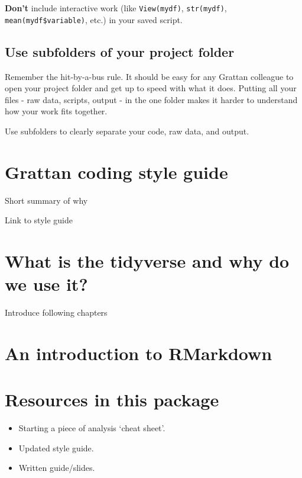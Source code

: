 \documentclass[]{book}
\providecommand{\tightlist}{%
  \setlength{\itemsep}{0pt}\setlength{\parskip}{0pt}}
\begin{document}
\textbf{Don't} include interactive work (like \texttt{View(mydf)}, \texttt{str(mydf)}, \texttt{mean(mydf\$variable)}, etc.) in your saved script.

\hypertarget{use-subfolders-of-your-project-folder}{%
\subsection{Use subfolders of your project folder}\label{use-subfolders-of-your-project-folder}}

Remember the hit-by-a-bus rule. It should be easy for any Grattan colleague to open your project folder and get up to speed with what it does. Putting all your files - raw data, scripts, output - in the one folder makes it harder to understand how your work fits together.

Use subfolders to clearly separate your code, raw data, and output.

\hypertarget{grattan-coding-style-guide}{%
\section{Grattan coding style guide}\label{grattan-coding-style-guide}}

Short summary of why

Link to style guide

\hypertarget{what-is-the-tidyverse-and-why-do-we-use-it}{%
\section{What is the tidyverse and why do we use it?}\label{what-is-the-tidyverse-and-why-do-we-use-it}}

Introduce following chapters

\hypertarget{an-introduction-to-rmarkdown}{%
\section{An introduction to RMarkdown}\label{an-introduction-to-rmarkdown}}

\hypertarget{resources-in-this-package}{%
\section{Resources in this package}\label{resources-in-this-package}}

\begin{itemize}
\tightlist
\item
  Starting a piece of analysis `cheat sheet'.
\item
  Updated style guide.
\item
  Written guide/slides.
\end{itemize}
\end{document}
